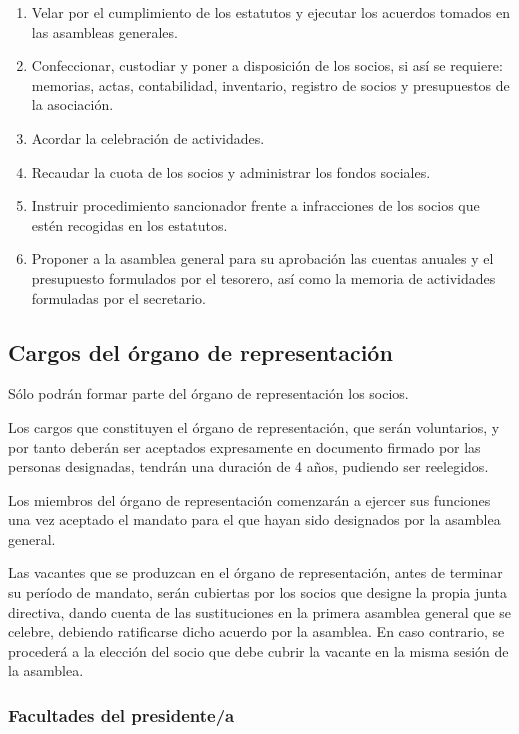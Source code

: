\documentclass[a4paper, 12pt, oneside]{book}
\begin{document}
\begin{enumerate}
    \item Velar por el cumplimiento de los estatutos y ejecutar los acuerdos tomados en las asambleas generales.  
    \item Confeccionar, custodiar y poner a disposición de los socios, si así se requiere: memorias, actas, contabilidad, inventario, registro de socios y presupuestos de la asociación.  
    \item Acordar la celebración de actividades.  
    \item Recaudar la cuota de los socios y administrar los fondos sociales.  
    \item Instruir procedimiento sancionador frente a infracciones de los socios que estén recogidas en los estatutos.  
    \item Proponer a la asamblea general para su aprobación las cuentas anuales y el presupuesto formulados por el tesorero, así como la memoria de actividades formuladas por el secretario.
\end{enumerate}

\subsection{Cargos del órgano de representación}

Sólo podrán formar parte del órgano de representación los socios.

Los cargos que constituyen el órgano de representación, que serán voluntarios, y por tanto deberán ser aceptados expresamente en documento firmado por las personas designadas, tendrán una duración de 4 años, pudiendo ser reelegidos.

Los miembros del órgano de representación comenzarán a ejercer sus funciones una vez aceptado el mandato para el que hayan sido designados por la asamblea general.

Las vacantes que se produzcan en el órgano de representación, antes de terminar su período de mandato, serán cubiertas por los socios que designe la propia junta directiva, dando cuenta de las sustituciones en la primera asamblea general que se celebre, debiendo ratificarse dicho acuerdo por la asamblea. En caso contrario, se procederá a la elección del socio que debe cubrir la vacante en la misma sesión de la asamblea.

\subsubsection{Facultades del presidente/a}
\end{document}
